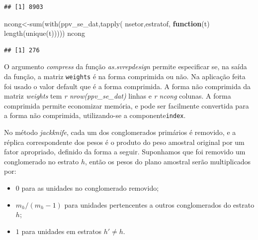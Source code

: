 \documentclass[
  12pt,
  brazilian,
]{book}
\newenvironment{Shaded}{\begin{snugshade}}{\end{snugshade}}
\newcommand{\ControlFlowTok}[1]{\textcolor[rgb]{0.13,0.29,0.53}{\textbf{#1}}}
\newcommand{\FunctionTok}[1]{\textcolor[rgb]{0.00,0.00,0.00}{#1}}
\newcommand{\NormalTok}[1]{#1}
\newcommand{\OtherTok}[1]{\textcolor[rgb]{0.56,0.35,0.01}{#1}}
\newcommand{\SpecialCharTok}[1]{\textcolor[rgb]{0.00,0.00,0.00}{#1}}
\providecommand{\tightlist}{%
  \setlength{\itemsep}{0pt}\setlength{\parskip}{0pt}}
\theoremstyle{definition}
\theoremstyle{definition}
\theoremstyle{definition}
\theoremstyle{definition}
\theoremstyle{remark}
\begin{document}
\begin{Shaded}
\end{Shaded}

\begin{verbatim}
## [1] 8903
\end{verbatim}

\begin{Shaded}
\begin{Highlighting}[]
\NormalTok{ncong}\OtherTok{\textless{}{-}}\FunctionTok{sum}\NormalTok{(}\FunctionTok{with}\NormalTok{(ppv\_se\_dat,}\FunctionTok{tapply}\NormalTok{( nsetor,estratof, }\ControlFlowTok{function}\NormalTok{(t) }\FunctionTok{length}\NormalTok{(}\FunctionTok{unique}\NormalTok{(t)))))}
\NormalTok{ncong}
\end{Highlighting}
\end{Shaded}

\begin{verbatim}
## [1] 276
\end{verbatim}

O argumento \emph{compress} da função \emph{as.svrepdesign} permite especificar se, na saída da função, a matriz
\texttt{weights} é na forma comprimida ou não. Na aplicação feita foi usado o valor default que é a forma comprimida.
A forma não comprimida da matriz \emph{weights} tem \emph{r nrow(ppv\_se\_dat)} linhas e \emph{r ncong} colunas. A forma comprimida
permite economizar memória, e pode ser facilmente convertida para a forma não comprimida, utilizando-se a componente\texttt{index}.

No método \emph{jackknife}, cada um dos conglomerados primários é removido, e a réplica correspondente dos pesos é o produto
do peso amostral original por um fator apropriado, definido da forma a seguir. Suponhamos que foi removido um conglomerado
no estrato \(h\), então os pesos do plano amostral serão multiplicados por:

\begin{itemize}
\tightlist
\item
  \(0\) para as unidades no conglomerado removido;
\item
  \(m_h/(m_h-1)\) para unidades pertencentes a outros conglomerados do estrato \(h\);
\item
  \(1\) para unidades em estratos \(h'\neq h\).
\end{itemize}
\end{document}
